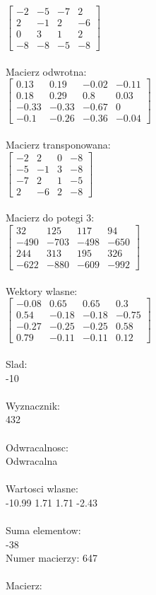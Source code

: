 \documentclass[a4paper,12pt]{article}
\begin{document}
$\begin{bmatrix} -2&-5&-7&2\\2&-1&2&-6\\0&3&1&2\\-8&-8&-5&-8 \end{bmatrix}$
\\
\\
Macierz odwrotna:\\

$\begin{bmatrix} 0.13&0.19&-0.02&-0.11\\0.18&0.29&0.8&0.03\\-0.33&-0.33&-0.67&0\\-0.1&-0.26&-0.36&-0.04 \end{bmatrix}$
\\
\\
Macierz transponowana:\\

$\begin{bmatrix} -2&2&0&-8\\-5&-1&3&-8\\-7&2&1&-5\\2&-6&2&-8 \end{bmatrix}$
\\
\\
Macierz do potegi 3:\\

$\begin{bmatrix} 32&125&117&94\\-490&-703&-498&-650\\244&313&195&326\\-622&-880&-609&-992 \end{bmatrix}$
\\
\\
Wektory wlasne:\\

$\begin{bmatrix} -0.08&0.65&0.65&0.3\\0.54&-0.18&-0.18&-0.75\\-0.27&-0.25&-0.25&0.58\\0.79&-0.11&-0.11&0.12 \end{bmatrix}$
\\
\\
Slad:\\
-10
\\
\\
Wyznacznik:\\
432
\\
\\
Odwracalnosc:\\
Odwracalna
\\
\\
Wartosci wlasne:\\
-10.99 1.71 1.71 -2.43
\\
\\
Suma elementow:\\
-38
\\
\newpage
Numer macierzy:
647
\\
\\
Macierz:\\
\end{document}
